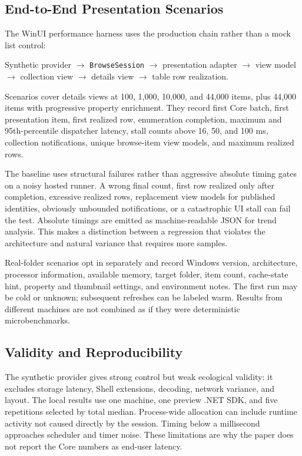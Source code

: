 \documentclass[10pt,a4paper,twoside]{article}
\begin{document}
\subsection{End-to-End Presentation Scenarios}

The WinUI performance harness uses the production chain rather than a mock list control:

\begin{center}
\small
Synthetic provider $\rightarrow$ \texttt{BrowseSession} $\rightarrow$ presentation adapter
$\rightarrow$ view model $\rightarrow$ collection view $\rightarrow$ details view
$\rightarrow$ table row realization.
\end{center}

Scenarios cover details views at 100, 1,000, 10,000, and 44,000 items, plus 44,000 items with progressive
property enrichment. They record first Core batch, first presentation item, first realized row, enumeration
completion, maximum and 95th-percentile dispatcher latency, stall counts above 16, 50, and 100 ms, collection
notifications, unique browse-item view models, and maximum realized rows.

The baseline uses structural failures rather than aggressive absolute timing gates on a noisy hosted runner. A
wrong final count, first row realized only after completion, excessive realized rows, replacement view models for
published identities, obviously unbounded notifications, or a catastrophic UI stall can fail the test. Absolute
timings are emitted as machine-readable JSON for trend analysis. This makes a distinction between a regression
that violates the architecture and natural variance that requires more samples.

Real-folder scenarios opt in separately and record Windows version, architecture, processor information,
available memory, target folder, item count, cache-state hint, property and thumbnail settings, and environment
notes. The first run may be cold or unknown; subsequent refreshes can be labeled warm. Results from different
machines are not combined as if they were deterministic microbenchmarks.

\subsection{Validity and Reproducibility}

The synthetic provider gives strong control but weak ecological validity: it excludes storage latency, Shell
extensions, decoding, network variance, and layout. The local results use one machine, one preview .NET SDK, and
five repetitions selected by total median. Process-wide allocation can include runtime activity not caused
directly by the session. Timing below a millisecond approaches scheduler and timer noise. These limitations are
why the paper does not report the Core numbers as end-user latency.
\end{document}
